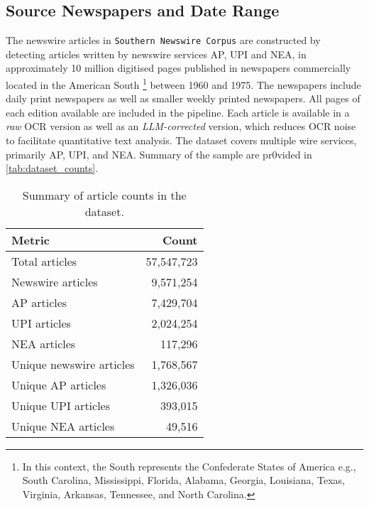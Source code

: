 \documentclass{article}
\begin{document}
\subsection{Source Newspapers and Date Range}
The newswire articles in \texttt{Southern Newswire Corpus} are constructed by detecting articles written by newswire services AP, UPI and NEA, in approximately 10 million digitised pages published in newspapers commercially located in the American South \footnote{In this context, the South represents the Confederate States of America e.g., South Carolina, Mississippi, Florida, Alabama, Georgia, Louisiana, Texas, Virginia, Arkansas, Tennessee, and North Carolina.} between 1960 and 1975. The newspapers include daily print newspapers as well as smaller weekly printed newspapers. All pages of each edition available are included in the pipeline. Each article is available in a \textit{raw} OCR version as well as an \textit{LLM-corrected} version, which reduces OCR noise to facilitate quantitative text analysis. The dataset covers multiple wire services, primarily AP, UPI, and NEA. Summary of the sample are pr0vided in \autoref{tab:dataset_counts}.

\begin{table}[H]
\centering
\begin{tabular}{l r}
\hline
\textbf{Metric} & \textbf{Count} \\
\hline
Total articles & 57,547,723 \\ 
Newswire articles & 9,571,254 \\ 
AP articles &  7,429,704\\ 
UPI articles &  2,024,254\\ 
NEA articles &  117,296\\ 
Unique newswire articles & 1,768,567 \\ 
Unique AP articles &  1,326,036\\ 
Unique UPI articles & 393,015 \\ 
Unique NEA articles & 49,516 \\ 
\hline
\end{tabular}
\caption{Summary of article counts in the dataset.}
\label{tab:dataset_counts}
\end{table}
\end{document}
